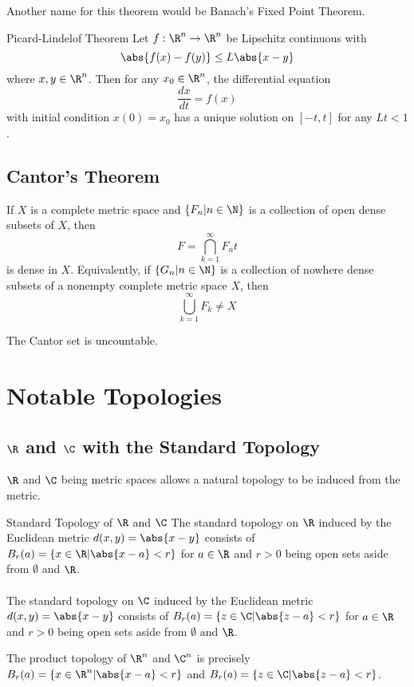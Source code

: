 Another name for this theorem would be Banach's Fixed Point Theorem. 

\begin{thm}{Picard-Lindelof Theorem}{} Let $f:\R^n\to\R^n$ be Lipschitz continuous with $$\abs{f(x)-f(y)}\leq L\abs{x-y}$$ where $x,y\in\R^n$. Then for any $x_0\in\R^n$, the differential equation $$\frac{dx}{dt}=f(x)$$ with initial condition $x(0)=x_0$ has a unique solution on $[-t,t]$ for any $Lt<1$. 
\end{thm}

\subsection{Cantor's Theorem}
\begin{thm}{}{} If $X$ is a complete metric space and $\{F_n|n\in\N\}$ is a collection of open dense subsets of $X$, then $$F=\bigcap_{k=1}^\infty F_nt$$ is dense in $X$. Equivalently, if $\{G_n|n\in\N\}$ is a collection of nowhere dense subsets of a nonempty complete metric space $X$, then $$\bigcup_{k=1}^\infty F_k\neq X$$
\end{thm}

\begin{lmm}{}{} The Cantor set is uncountable. 
\end{lmm}



\pagebreak
\section{Notable Topologies}
\subsection{$\R$ and $\C$ with the Standard Topology}
$\R$ and $\C$ being metric spaces allows a natural topology to be induced from the metric. 
\begin{defn}{Standard Topology of $\R$ and $\C$}{} The standard topology on $\R$ induced by the Euclidean metric $d(x,y)=\abs{x-y}$ consists of $B_r(a)=\{x\in\R|\abs{x-a}<r\}$ for $a\in\R$ and $r>0$ being open sets aside from $\emptyset$ and $\R$. \\~\\
The standard topology on $\C$ induced by the Euclidean metric $d(x,y)=\abs{x-y}$ consists of $B_r(a)=\{z\in\C|\abs{z-a}<r\}$ for $a\in\R$ and $r>0$ being open sets aside from $\emptyset$ and $\R$. 
\end{defn}

\begin{prp}{}{} The product topology of $\R^n$ and $\C^n$ is precisely $B_r(a)=\{x\in\R^n|\abs{x-a}<r\}$ and $B_r(a)=\{z\in\C|\abs{z-a}<r\}$. 
\end{prp}

